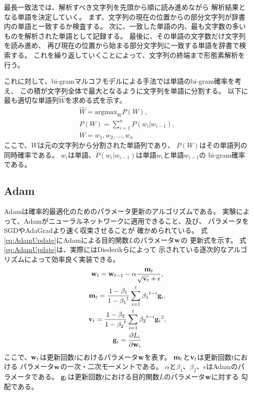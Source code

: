 最長一致法では、解析すべき文字列を先頭から順に読み進めながら
解析結果となる単語を決定していく。
まず、文字列の現在の位置からの部分文字列が辞書内の単語と一致するか検査する。
次に、一致した単語の内、最も文字数の多いものを解析された単語として記録する。
最後に、その単語の文字数だけ文字列を読み進め、
再び現在の位置から始まる部分文字列に一致する単語を辞書で検索する。
これを繰り返していくことによって、文字列の終端まで形態素解析を行う。

これに対して、bi-gramマルコフモデルによる手法では単語のbi-gram確率を考え、
この積が文字列全体で最大となるように文字列を単語に分割する。
以下に最も適切な単語列$\hat{W}$を求める式を示す。
\begin{gather}
  \hat{W} = \text{argmax}_{W} P(W), \\
  P(W) = \sum^{n}_{i = 1} P(w_i | w_{i - 1}), \nonumber \\
  W = w_1, w_2, ... , w_n \nonumber
\end{gather}
ここで、$W$は元の文字列から分割された単語列であり、
$P(W)$はその単語列の同時確率である。
$w_i$は単語、$P(w_i | w_{i - 1})$は単語$w_i$と単語$w_{i - 1}$の
bi-gram確率である。


\subsection{Adam}

Adam\cite{diederik15}は確率的最適化のためのパラメータ更新のアルゴリズムである。
実験によって、Adamがニューラルネットワークに適用できること、及び、
パラメータをSGDやAdaGrad\cite{john12}より速く収束させることが
確かめられている。
式\ref{eq:AdamUpdate}にAdamによる目的関数$L$のパラメータ$\mathbf{w}$の
更新式を示す。
式\ref{eq:AdamUpdate}は、実際にはDiederikら\cite{diederik15}によって
示されている逐次的なアルゴリズムによって効率良く実装できる。
\begin{gather} \label{eq:AdamUpdate}
  \mathbf{w}_t = \mathbf{w}_{t - 1}
                 - \alpha \frac{\mathbf{m}_t}
                               {\sqrt{\mathbf{v}_t} + \epsilon}, \\
  \mathbf{m}_t = \frac{1 - \beta_1}{1 - {\beta_1}^t}
                 \sum^t_{i = 1} {\beta_1}^{t - i} \mathbf{g}_i, \nonumber \\
  \mathbf{v}_t = \frac{1 - \beta_2}{1 - {\beta_2}^t}
                 \sum^t_{i = 1} {\beta_2}^{t - i} {\mathbf{g}_i}^2, \nonumber \\
  \mathbf{g}_i = \frac{\partial L_i}{\partial \mathbf{w}_i} \nonumber
\end{gather}
ここで、$\mathbf{w}_t$は更新回数$t$におけるパラメータ$\mathbf{w}$を表す。
$\mathbf{m}_t$と$\mathbf{v}_t$は更新回数$t$における
パラメータ$\mathbf{w}$の一次・二次モーメントである。
$\alpha$と$\beta_1$、$\beta_2$、$\epsilon$はAdamのパラメータである。
$\mathbf{g}_t$は更新回数$t$における目的関数$L$のパラメータ$\mathbf{w}$に対する
勾配である。

